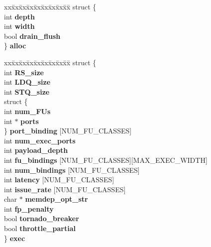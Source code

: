 \begin{CompactItemize}
\begin{tabbing}
\end{tabbing}\item 
\begin{tabbing}
xx\=xx\=xx\=xx\=xx\=xx\=xx\=xx\=xx\=\kill
struct \{\\
\>int {\bf depth}\\
\>int {\bf width}\\
\>bool {\bf drain\_flush}\\
\} {\bf alloc}\\

\end{tabbing}\item 
\begin{tabbing}
xx\=xx\=xx\=xx\=xx\=xx\=xx\=xx\=xx\=\kill
struct \{\\
\>int {\bf RS\_size}\\
\>int {\bf LDQ\_size}\\
\>int {\bf STQ\_size}\\
\>struct \{\\
\>\>int {\bf num\_FUs}\\
\>\>int $\ast$ {\bf ports}\\
\>\} {\bf port\_binding} [NUM\_FU\_CLASSES]\\
\>int {\bf num\_exec\_ports}\\
\>int {\bf payload\_depth}\\
\>int {\bf fu\_bindings} [NUM\_FU\_CLASSES][MAX\_EXEC\_WIDTH]\\
\>int {\bf num\_bindings} [NUM\_FU\_CLASSES]\\
\>int {\bf latency} [NUM\_FU\_CLASSES]\\
\>int {\bf issue\_rate} [NUM\_FU\_CLASSES]\\
\>char $\ast$ {\bf memdep\_opt\_str}\\
\>int {\bf fp\_penalty}\\
\>bool {\bf tornado\_breaker}\\
\>bool {\bf throttle\_partial}\\
\} {\bf exec}\\


\end{tabbing}
\end{CompactItemize}
